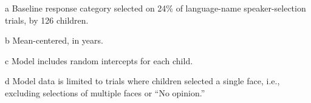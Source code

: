 \begin{table}[ht]
\begin{threeparttable}
\begin{tabular}{lllrllllr}
\end{tabular}
\begin{tablenotes}[flushleft]
    \item[a] Baseline response category selected on 24\% of language-name speaker-selection trials, by 126 children.
    \item[b] Mean-centered, in years.
    \item[c] Model includes random intercepts for each child.
    \item[d] Model data is limited to trials where children selected a single face, i.e., excluding selections of multiple faces or ``No opinion.'' 
\end{tablenotes}
\end{threeparttable}
\end{table}
